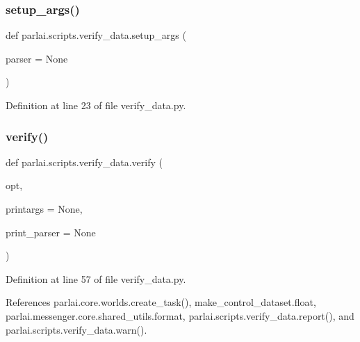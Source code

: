 \subsubsection{\texorpdfstring{setup\+\_\+args()}{setup\_args()}}
{\footnotesize\ttfamily def parlai.\+scripts.\+verify\+\_\+data.\+setup\+\_\+args (\begin{DoxyParamCaption}\item[{}]{parser = {\ttfamily None} }\end{DoxyParamCaption})}



Definition at line 23 of file verify\+\_\+data.\+py.

\mbox{\label{namespaceparlai_1_1scripts_1_1verify__data_acf6da63d62b2bf71c8fb7860e944a5bf}} 
\subsubsection{\texorpdfstring{verify()}{verify()}}
{\footnotesize\ttfamily def parlai.\+scripts.\+verify\+\_\+data.\+verify (\begin{DoxyParamCaption}\item[{}]{opt,  }\item[{}]{printargs = {\ttfamily None},  }\item[{}]{print\+\_\+parser = {\ttfamily None} }\end{DoxyParamCaption})}



Definition at line 57 of file verify\+\_\+data.\+py.



References parlai.\+core.\+worlds.\+create\+\_\+task(), make\+\_\+control\+\_\+dataset.\+float, parlai.\+messenger.\+core.\+shared\+\_\+utils.\+format, parlai.\+scripts.\+verify\+\_\+data.\+report(), and parlai.\+scripts.\+verify\+\_\+data.\+warn().


